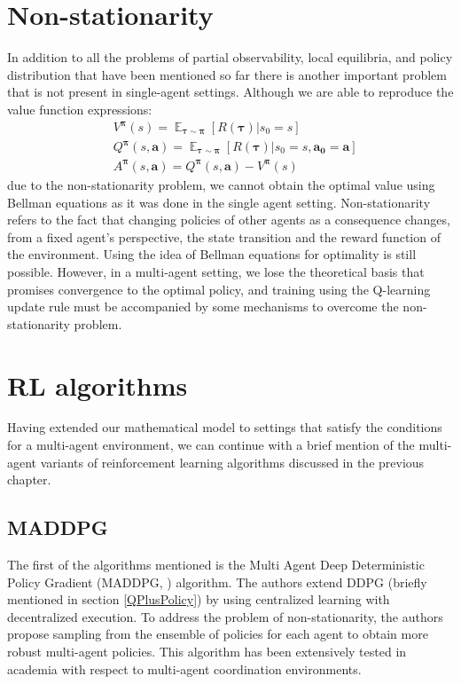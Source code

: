 \section{Non-stationarity}
In addition to all the problems of partial observability, local equilibria, and policy distribution that have been mentioned so far
there is another important problem that is not present in single-agent settings.
Although we are able to reproduce the value function expressions:
\begin{align*}  
    &V^{\boldsymbol{\pi}}(s) = \mathop{\mathbb{E}}_{\boldsymbol{\tau} \sim \boldsymbol{\pi}}[R(\boldsymbol{\tau})|s_0=s] \\
    &Q^{\boldsymbol{\pi}}(s,\boldsymbol{a}) = \mathop{\mathbb{E}}_{\boldsymbol{\tau} \sim \boldsymbol{\pi}}[R(\boldsymbol{\tau})|s_0=s,\boldsymbol{a_0}=\boldsymbol{a}] \\ 
    &A^{\boldsymbol{\pi}}(s,\boldsymbol{a}) = Q^{\boldsymbol{\pi}}(s,\boldsymbol{a}) - V^{\boldsymbol{\pi}}(s)
\end{align*}
due to the non-stationarity problem, we cannot obtain the optimal value using Bellman equations as it was done in the single agent setting.
Non-stationarity refers to the fact that changing policies of other agents as a consequence changes, from a fixed agent's perspective, the state transition and the reward function of the environment. 
Using the idea of Bellman equations for optimality is still possible.
However, in a multi-agent setting, we lose the theoretical basis that promises convergence to the optimal policy, and training using the Q-learning update rule must be accompanied by some mechanisms to overcome the non-stationarity problem.

\section{RL algorithms}
Having extended our mathematical model to settings that satisfy the conditions for a multi-agent environment, we can continue with a brief mention of the multi-agent variants of reinforcement learning algorithms discussed in the previous chapter.
\subsection*{MADDPG}
The first of the algorithms mentioned is the Multi Agent Deep Deterministic Policy Gradient (MADDPG, \cite{MADDPG}) algorithm.
The authors extend DDPG (briefly mentioned in section \ref{QPlusPolicy}) by using centralized learning with decentralized execution.
To address the problem of non-stationarity, the authors propose sampling from the ensemble of policies for each agent to obtain more robust multi-agent policies.
This algorithm has been extensively tested in academia with respect to multi-agent coordination environments.
